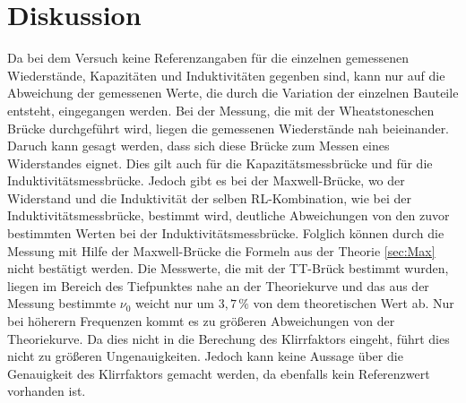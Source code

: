 \section{Diskussion}
\label{sec:Diskussion}
Da bei dem Versuch keine Referenzangaben für die
einzelnen gemessenen Wiederstände, Kapazitäten und Induktivitäten
gegenben sind, kann nur auf die Abweichung der gemessenen
Werte,
die durch die Variation der einzelnen Bauteile entsteht,
eingegangen werden.
Bei der Messung, die mit der Wheatstoneschen Brücke durchgeführt
wird, liegen die gemessenen Wiederstände nah beieinander.
Daruch kann gesagt werden, dass sich diese Brücke zum
Messen eines Widerstandes eignet.
Dies gilt auch für die Kapazitätsmessbrücke und für
die Induktivitätsmessbrücke.
Jedoch gibt es bei der Maxwell-Brücke, wo der Widerstand
und die Induktivität der selben
RL-Kombination, wie bei der Induktivitätsmessbrücke,
bestimmt wird, deutliche Abweichungen von den zuvor
bestimmten Werten bei der Induktivitätsmessbrücke.
Folglich können durch die Messung mit Hilfe der Maxwell-Brücke
die Formeln aus der Theorie \ref{sec:Max} nicht bestätigt werden.
Die Messwerte, die mit der TT-Brück bestimmt wurden,
liegen im Bereich des Tiefpunktes nahe an der Theoriekurve und
das aus der Messung bestimmte $\nu_0$ weicht nur
um $3,7\,\si{\percent}$ von dem theoretischen Wert ab.
Nur bei höherern Frequenzen kommt es zu größeren Abweichungen von der
Theoriekurve.
Da dies nicht in die Berechung des Klirrfaktors
eingeht, führt dies nicht zu größeren Ungenauigkeiten.
Jedoch kann keine Aussage über die Genauigkeit
des Klirrfaktors gemacht werden, da ebenfalls kein Referenzwert
vorhanden ist.
